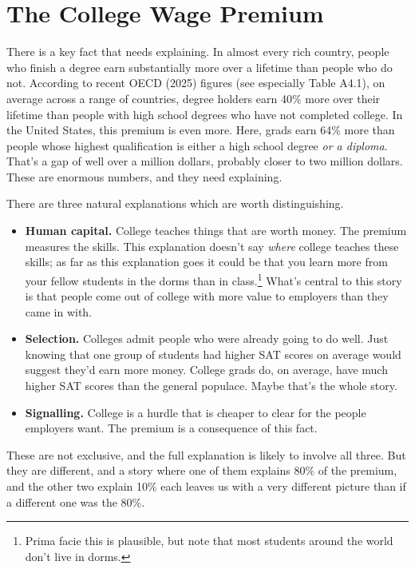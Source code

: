 \documentclass[
  11pt,
  letterpaper,
]{scrbook}
\providecommand{\tightlist}{%
  \setlength{\itemsep}{0pt}\setlength{\parskip}{0pt}}
\begin{document}
\section{The College Wage Premium}\label{sec-wage-premium}

There is a key fact that needs explaining. In almost every rich country,
people who finish a degree earn substantially more over a lifetime than
people who do not. According to recent OECD (2025) figures (see
especially Table A4.1), on average across a range of countries, degree
holders earn 40\% more over their lifetime than people with high school
degrees who have not completed college. In the United States, this
premium is even more. Here, grads earn 64\% more than people whose
highest qualification is either a high school degree \emph{or a
diploma}. That's a gap of well over a million dollars, probably closer
to two million dollars. These are enormous numbers, and they need
explaining.

There are three natural explanations which are worth distinguishing.

\begin{itemize}
\tightlist
\item
  \textbf{Human capital.} College teaches things that are worth money.
  The premium measures the skills. This explanation doesn't say
  \emph{where} college teaches these skills; as far as this explanation
  goes it could be that you learn more from your fellow students in the
  dorms than in class.\footnote{Prima facie this is plausible, but note
    that most students around the world don't live in dorms.} What's
  central to this story is that people come out of college with more
  value to employers than they came in with.
\item
  \textbf{Selection.} Colleges admit people who were already going to do
  well. Just knowing that one group of students had higher SAT scores on
  average would suggest they'd earn more money. College grads do, on
  average, have much higher SAT scores than the general populace. Maybe
  that's the whole story.
\item
  \textbf{Signalling.} College is a hurdle that is cheaper to clear for
  the people employers want. The premium is a consequence of this fact.
\end{itemize}

These are not exclusive, and the full explanation is likely to involve
all three. But they are different, and a story where one of them
explains 80\% of the premium, and the other two explain 10\% each leaves
us with a very different picture than if a different one was the 80\%.
\end{document}

